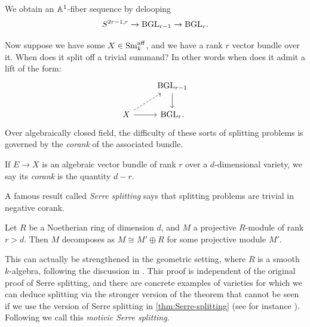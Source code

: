 \documentclass[11pt,openany]{book}
\providecommand{\aff}{\mathrm{aff}}
\begin{document}
\begin{corollary} We obtain an $\mathbb{A}^1$-fiber sequence by delooping
\label{cor:BGL_deloop_fiber}
\begin{equation}\label{eqn:fiber-stabilization-BGLr}
\begin{aligned}
    S^{2r-1,r} \to \mathrm{BGL}_{r-1} \to \mathrm{BGL}_r.
\end{aligned}
\end{equation}
\end{corollary}

Now suppose we have some $X \in \Sm_k^\aff$, and we have a rank $r$ vector bundle over it. When does it split off a trivial summand? In other words when does it admit a lift of the form:
\[ \begin{tikzcd}
     & \BGL_{r-1}\dar\\
    X\rar\ar[ur,dashed] & \BGL_r.
\end{tikzcd} \]
%
Over algebraically closed field, the difficulty of these sorts of splitting problems is governed by the \textit{corank} of the associated bundle.

\begin{definition} If $E \to X$ is an algebraic vector bundle of rank $r$ over a $d$-dimensional variety, we say its \textit{corank} is the quantity $d-r$.
\end{definition}


A famous result called \textit{Serre splitting} says that splitting problems are trivial in negative corank.

\begin{theorem}
\label{thm:Serre-splitting} 
Let $R$ be a Noetherian ring of dimension $d$, and $M$ a projective $R$-module of rank $r > d$. Then $M$ decomposes as $M \cong M' \oplus R$ for some projective module $M'$.
\end{theorem}

This can actually be strengthened in the geometric setting, where $R$ is a smooth $k$-algebra, following the discussion in \cite[4.2.1]{AF-survey}. This proof is independent of the original proof of Serre splitting, and there are concrete examples of varieties for which we can deduce splitting via the stronger version of the theorem that cannot be seen if we use the version of Serre splitting in \autoref{thm:Serre-splitting} (see for instance \cite[3.3.6,~3.5.4]{AF-survey}). Following \cite[Theorem~1]{AF-survey} we call this \textit{motivic Serre splitting}.
\end{document}
